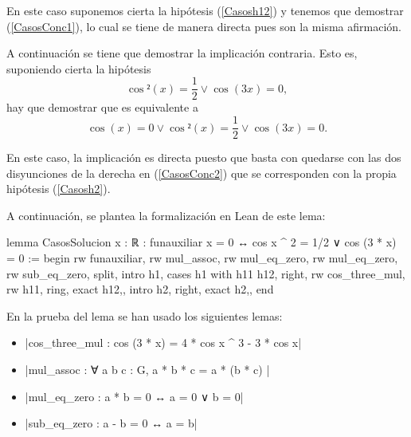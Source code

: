 \begin{demostracion}
\begin{itemize}
    En este caso suponemos cierta la hipótesis (\ref{Casosh12})
    y tenemos que demostrar (\ref{CasosConc1}), lo cual se tiene
    de manera directa pues son la misma afirmación.
  \end{itemize}

  \noindent
  \framebox{\longleftarrow} A continuación se tiene que demostrar
  la implicación contraria. Esto es, suponiendo cierta la
  hipótesis
  \begin{equation}\label{Casosh2}\tag{h2}
    \cos²(x)=\frac{1}{2} \lor \cos(3x)=0,
  \end{equation}
  hay que demostrar que es equivalente a
  \begin{equation}\label{CasosConc2}
    \cos(x)=0 \lor \cos²(x)=\frac{1}{2}\lor \cos(3x)=0.
  \end{equation}

  En este caso, la implicación es directa puesto que basta con
  quedarse con las dos disyunciones de la derecha en
  (\ref{CasosConc2}) que se corresponden con la propia hipótesis
  (\ref{Casosh2}).
\end{demostracion}

A continuación, se plantea la formalización en Lean de este lema:
\begin{leancode}
lemma CasosSolucion {x : ℝ} :
funauxiliar x = 0 ↔ cos x ^ 2 = 1/2 ∨ cos (3 * x) = 0 :=
begin
  rw funauxiliar,
  rw mul_assoc,
  rw mul_eq_zero,
  rw mul_eq_zero,
  rw sub_eq_zero,
  split,
  {intro h1,
  cases h1 with h11 h12,
  right,
  rw cos_three_mul,
  rw h11,
  ring,
  exact h12,},
  {intro h2,
  right,
  exact h2,},
end
\end{leancode}

En la prueba del lema se han usado los siguientes lemas:
\begin{itemize}
\item {}|cos_three_mul : cos (3 * x) = 4 * cos x ^ 3 - 3 * cos x|
\item {}|mul_assoc : ∀ a b c : G, a * b * c = a * (b * c) |
\item {}|mul_eq_zero : a * b = 0 ↔ a = 0 ∨ b = 0|
\item {}|sub_eq_zero : a - b = 0 ↔ a = b|
\end{itemize}

